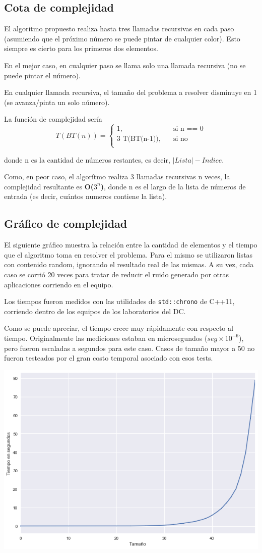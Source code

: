 	\subsection{Cota de complejidad}

	El algoritmo propuesto realiza hasta tres llamadas recursivas en cada paso (asumiendo que el próximo número se puede pintar de cualquier color). Esto siempre es cierto para los primeros dos elementos.

	En el mejor caso, en cualquier paso se llama solo una llamada recursiva (no se puede pintar el número).

	En cualquier llamada recursiva, el tamaño del problema a resolver disminuye en 1 (se avanza/pinta un solo número).

	La función de complejidad sería
	\[
	T(BT(n)) =
		\begin{cases}
			\text{1,} &\quad\text{si n == 0}\\
			\text{3 T(BT(n-1)),} &\quad\text{si no} \\
		\end{cases}
	\]

	donde n es la cantidad de números restantes, es decir, $|Lista| - Indice$.

	Como, en peor caso, el algorítmo realiza 3 llamadas recursivas n veces, la complejidad resultante es \textbf{O($3^n$)}, donde n es el largo de la lista de números de entrada (es decir, cuántos numeros contiene la lista).

	\pagebreak
	\subsection{Gráfico de complejidad}

	El siguiente gráfico muestra la relación entre la cantidad de elementos y el tiempo que el algoritmo toma en resolver el problema. Para el mismo se utilizaron listas con contenido random, ignorando el resultado real de las mismas. A su vez, cada caso se corrió 20 veces para tratar de reducir el ruido generado por otras aplicaciones corriendo en el equipo.

	Los tiempos fueron medidos con las utilidades de \texttt{std::chrono} de C++11, corriendo dentro de los equipos de los laboratorios del DC.

	Como se puede apreciar, el tiempo crece muy rápidamente con respecto al tiempo. Originalmente las mediciones estaban en microsegundos ($seg \times 10^{-6}$), pero fueron escaladas a segundos para este caso. Casos de tamaño mayor a 50 no fueron testeados por el gran costo temporal asociado con esos tests.

	\begin{center}
	\includegraphics[width=.8\textwidth]{ej1.png}
	\end{center}